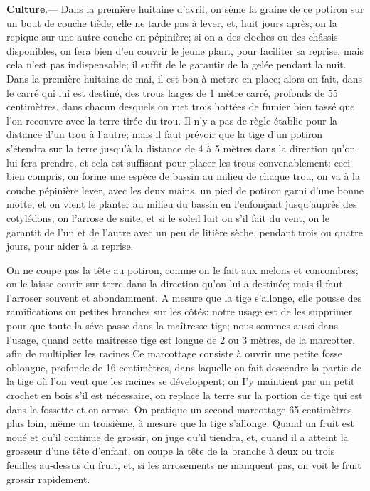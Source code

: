 \documentclass[10pt,a4paper]{book}
\begin{document}
\textbf{Culture}.--- Dans la première huitaine d'avril, on sème la graine de ce potiron sur un bout de couche tiède; elle ne tarde pas à lever, et, huit jours après, on la repique sur une autre couche en pépinière; si on a des cloches ou des châssis disponibles, on fera bien d'en couvrir le jeune plant, pour faciliter sa reprise, mais cela n'est pas indispensable; il suffit de le garantir de la gelée pendant la nuit. Dans la première huitaine de mai, il est bon à mettre en place; alors on fait, dans le carré qui lui est destiné, des trous larges de 1 mètre carré, profonds de 55 centimètres, dans chacun desquels on met trois hottées de fumier bien tassé que l'on recouvre avec la terre tirée du trou. Il n'y a pas de règle établie pour la distance d'un trou à l'autre; mais il faut prévoir que la tige d'un potiron s'étendra sur la terre jusqu'à la distance de 4 à 5 mètres dans la direction qu'on lui fera prendre, et cela est suffisant pour placer les trous convenablement: ceci bien compris, on forme une espèce de bassin au milieu de chaque trou, on va à la couche pépinière lever, avec les deux mains, un pied de potiron garni d'une bonne motte, et on vient le planter au milieu du bassin en l'enfonçant jusqu'auprès des cotylédons; on l'arrose de suite, et si le soleil luit ou s'il fait du vent, on le garantit de l'un et de l'autre avec un peu de litière sèche, pendant trois ou quatre jours, pour aider à la reprise.

On ne coupe pas la tête au potiron, comme on le fait aux melons et concombres; on le laisse courir sur terre dans la direction qu'on lui a destinée; mais il faut l'arroser souvent et abondamment. A mesure que la tige s'allonge, elle pousse des ramifications ou petites branches sur les côtés: notre usage est de les supprimer pour que toute la séve passe dans la maîtresse tige; nous sommes aussi dans l'usage, quand cette maîtresse tige est longue de 2 ou 3 mètres, de la marcotter, afin de multiplier les racines Ce marcottage consiste à ouvrir une petite fosse oblongue, profonde de 16 centimètres, dans laquelle on fait descendre la partie de la tige où l'on veut que les racines se développent; on I’y maintient par un petit crochet en bois s'il est nécessaire, on replace la terre sur la portion de tige qui est dans la fossette et on arrose. On pratique un second marcottage 65 centimètres plus loin, même un troisième, à mesure que la tige s'allonge. Quand un fruit est noué et qu'il continue de grossir, on juge qu'il tiendra, et, quand il a atteint la grosseur d'une tête d'enfant, on coupe la tête de la branche à deux ou trois feuilles au-dessus du fruit, et, si les arrosements ne manquent pas, on voit le fruit grossir rapidement.
\end{document}
